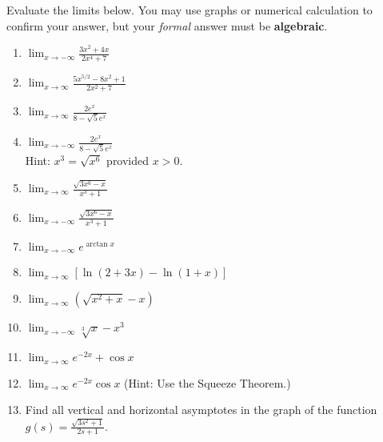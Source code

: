 \documentclass[11pt,fleqn]{article}
\begin{document}
\setlength{\parindent}{0cm}
\renewcommand{\headrulewidth}{0pt}
\newcommand{\blank}[1]{\rule{#1}{0.75pt}}
\renewcommand{\d}{\displaystyle}
\vspace*{-0.9in}
\begin{center}
  \Large {}
\end{center}
\small

Evaluate the limits below. You may use graphs or numerical calculation to confirm your answer, but your \emph{formal} answer must be \textbf{algebraic}.\\
\begin{enumerate}

\item $\d{\lim_{x\to-\infty}\frac{3x^2+4x}{2x^4+7}}$\\
\vspace{.5in}

\item $\d{\lim_{x\to \infty}\frac{5x^{5/2}-8x^2+1}{2x^2+7}}$\\
\vspace{.5in}

\item $\d{\lim_{x\to\infty} \frac{2e^x}{8-\sqrt{5}e^x}}$\\
\vfill

\item $\d{\lim_{x\to-\infty} \frac{2e^x}{8-\sqrt{5}e^x}}$\\
\vfill
\hspace*{-.2in} Hint: $x^3=\sqrt{x^6}$ provided $x >0.$ 
\item $\d{\lim_{x\to\infty}\frac{\sqrt{3x^6-x}}{x^3 + 1}}$\\
\vfill

\item $\d{\lim_{x\to-\infty}\frac{\sqrt{3x^6-x}}{x^3 + 1}}$\\
\vfill

\item $\d{\lim_{x\to-\infty} e^{\arctan x}}$\\
\vfill

\newpage

\item $\d{\lim_{x\to\infty} [ \ln (2 + 3x) - \ln (1+x) ]}$\\
\vfill

\item $\d{\lim_{x\to\infty}(\sqrt{x^2+x} - x)}$\\
\vfill

\item $\d{\lim_{x\to-\infty}} \sqrt[3]{x}-x^3$\\
\vfill

\item $\d{\lim_{x\to\infty}e^{-2x} +\cos x}$\\
\vfill

\item $\d{\lim_{x\to\infty}e^{-2x} \cos x}$ (Hint: Use the Squeeze Theorem.)\\
\vfill

\item Find all vertical and horizontal asymptotes in the graph of the function $\d g(s)=\frac{\sqrt{3s^2+1}}{2s+1}.$

\vspace{3in}

\end{enumerate}
 
\end{document}
